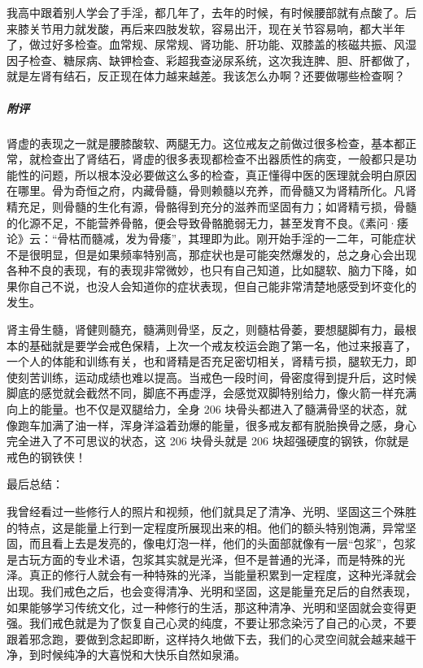 \begin{case}[坚固之相]
    我高中跟着别人学会了手淫，都几年了，去年的时候，有时候腰部就有点酸了。后来膝关节用力就发酸，再后来四肢发软，容易出汗，现在关节容易响，都大半年了，做过好多检查。血常规、尿常规、肾功能、肝功能、双膝盖的核磁共振、风湿因子检查、糖尿病、缺钾检查、彩超我查泌尿系统，这次我连脾、胆、肝都做了，就是左肾有结石，反正现在体力越来越差。我该怎么办啊？还要做哪些检查啊？
    \subparagraph{附评} 肾虚的表现之一就是腰膝酸软、两腿无力。这位戒友之前做过很多检查，基本都正常，就检查出了肾结石，肾虚的很多表现都检查不出器质性的病变，一般都只是功能性的问题，所以根本没必要做这么多的检查，真正懂得中医的医理就会明白原因在哪里。骨为奇恒之府，内藏骨髓，骨则赖髓以充养，而骨髓又为肾精所化。凡肾精充足，则骨髓的生化有源，骨骼得到充分的滋养而坚固有力；如肾精亏损，骨髓的化源不足，不能营养骨骼，便会导致骨骼脆弱无力，甚至发育不良。《素问·痿论》云：“骨枯而髓减，发为骨痿”，其理即为此。刚开始手淫的一二年，可能症状不是很明显，但是如果频率特别高，那症状也是可能突然爆发的，总之身心会出现各种不良的表现，有的表现非常微妙，也只有自己知道，比如腿软、脑力下降，如果你自己不说，也没人会知道你的症状表现，但自己能非常清楚地感受到坏变化的发生。

    肾主骨生髓，肾健则髓充，髓满则骨坚，反之，则髓枯骨萎，要想腿脚有力，最根本的基础就是要学会戒色保精，上次一个戒友校运会跑了第一名，他过来报喜了，一个人的体能和训练有关，也和肾精是否充足密切相关，肾精亏损，腿软无力，即使刻苦训练，运动成绩也难以提高。当戒色一段时间，骨密度得到提升后，这时候脚底的感觉就会截然不同，脚底不再虚浮，会感觉双脚特别给力，像火箭一样充满向上的能量。也不仅是双腿给力，全身 206 块骨头都进入了髓满骨坚的状态，就像跑车加满了油一样，浑身洋溢着劲爆的能量，很多戒友都有脱胎换骨之感，身心完全进入了不可思议的状态，这 206 块骨头就是 206 块超强硬度的钢铁，你就是戒色的钢铁侠！
\end{case}

最后总结：

我曾经看过一些修行人的照片和视频，他们就具足了清净、光明、坚固这三个殊胜的特点，这是能量上行到一定程度所展现出来的相。他们的额头特别饱满，异常坚固，而且看上去是发亮的，像电灯泡一样，他们的头面部就像有一层“包浆”，包浆是古玩方面的专业术语，包浆其实就是光泽，但不是普通的光泽，而是特殊的光泽。真正的修行人就会有一种特殊的光泽，当能量积累到一定程度，这种光泽就会出现。我们戒色之后，也会变得清净、光明和坚固，这是能量充足后的自然表现，如果能够学习传统文化，过一种修行的生活，那这种清净、光明和坚固就会变得更强。我们戒色就是为了恢复自己心灵的纯度，不要让邪念染污了自己的心灵，不要跟着邪念跑，要做到念起即断，这样持久地做下去，我们的心灵空间就会越来越干净，到时候纯净的大喜悦和大快乐自然如泉涌。

